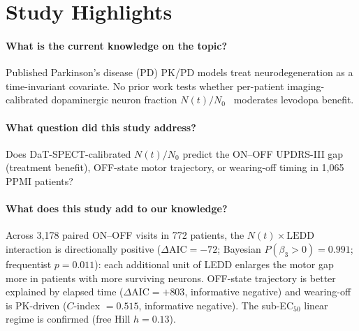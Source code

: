 
\label{ch:paper9}


\section*{Study Highlights}

\paragraph{What is the current knowledge on the topic?}
Published Parkinson's disease (PD) PK/PD models treat neurodegeneration as a time-invariant covariate. No prior work tests whether per-patient imaging-calibrated dopaminergic neuron fraction $N(t)/N_0$~\cite{dupre2026paper7} moderates levodopa benefit.

\paragraph{What question did this study address?}
Does DaT-SPECT-calibrated $N(t)/N_0$ predict the ON--OFF UPDRS-III gap (treatment benefit), OFF-state motor trajectory, or wearing-off timing in 1{,}065 PPMI patients?

\paragraph{What does this study add to our knowledge?}
Across 3{,}178 paired ON--OFF visits in 772 patients, the $N(t) \times \mathrm{LEDD}$ interaction is directionally positive ($\Delta\mathrm{AIC} = -72$; Bayesian $P(\beta_3 > 0) = 0.991$; frequentist $p = 0.011$): each additional unit of LEDD enlarges the motor gap more in patients with more surviving neurons. OFF-state trajectory is better explained by elapsed time ($\Delta\mathrm{AIC} = +803$, informative negative) and wearing-off is PK-driven ($C$-index $= 0.515$, informative negative). The sub-EC$_{50}$ linear regime is confirmed (free Hill $h = 0.13$).

